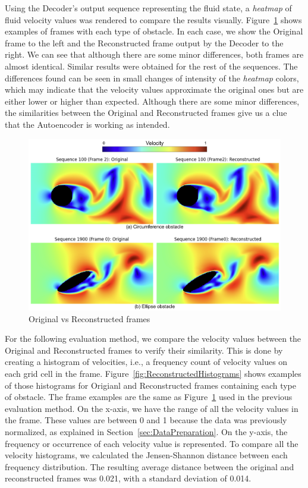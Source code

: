 Using the Decoder's output sequence representing the fluid state, a \textit{heatmap} of fluid velocity values was rendered to compare the results visually. Figure~\ref{fig:ReconstructedFrames} shows examples of frames with each type of obstacle. In each case, we show the Original frame to the left and the Reconstructed frame output by the Decoder to the right. We can see that although there are some minor differences, both frames are almost identical. Similar results were obtained for the rest of the sequences. The differences found can be seen in small changes of intensity of the \textit{heatmap} colors, which may indicate that the velocity values approximate the original ones but are either lower or higher than expected. Although there are some minor differences, the similarities between the Original and Reconstructed frames give us a clue that the Autoencoder is working as intended.

\begin{figure}[!htbp]
    \centering
    \includegraphics[width=1\linewidth]{images/autoencoder_frames.png}
    \caption{Original vs Reconstructed frames}
    \label{fig:ReconstructedFrames}
\end{figure}

For the following evaluation method, we compare the velocity values between the Original and Reconstructed frames to verify their similarity. This is done by creating a histogram of velocities, i.e., a frequency count of velocity values on each grid cell in the frame. Figure~\ref{fig:ReconstructedHistograms} shows examples of those histograms for Origianl and Reconstructed frames containing each type of obstacle. The frame examples are the same as Figure~\ref{fig:ReconstructedFrames} used in the previous evaluation method. On the x-axis, we have the range of all the velocity values in the frame. These values are between 0 and 1 because the data was previously normalized, as explained in Section~\ref{sec:DataPreparation}. On the y-axis, the frequency or occurrence of each velocity value is represented. To compare all the velocity histograms, we calculated the Jensen-Shannon distance between each frequency distribution. The resulting average distance between the original and reconstructed frames was 0.021, with a standard deviation of 0.014.


